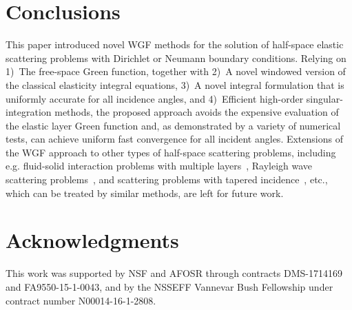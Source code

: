 \documentclass[10pt]{article}
\numberwithin{equation}{section}
\begin{document}
\section{Conclusions}

This paper introduced novel WGF methods for the solution of half-space
elastic scattering problems with Dirichlet or Neumann boundary
conditions. Relying on 1)~The free-space Green function, together with
2)~A novel windowed version of the classical elasticity integral
equations, 3)~A novel integral formulation that is uniformly accurate
for all incidence angles, and 4)~Efficient high-order
singular-integration methods, the proposed approach avoids the
expensive evaluation of the elastic layer Green function and, as
demonstrated by a variety of numerical tests, can achieve uniform fast
convergence for all incident angles. Extensions of the WGF approach to
other types of half-space scattering problems, including
e.g. fluid-solid interaction problems with multiple layers~\cite{P97},
Rayleigh wave scattering problems~\cite{AA04}, and scattering problems
with tapered incidence~\cite{T88}, etc., which can be treated by
similar methods, are left for future work.

\section*{Acknowledgments} 
This work was supported by NSF and AFOSR through contracts DMS-1714169
and FA9550-15-1-0043, and by the NSSEFF Vannevar Bush Fellowship under
contract number N00014-16-1-2808.


%
\end{document}
